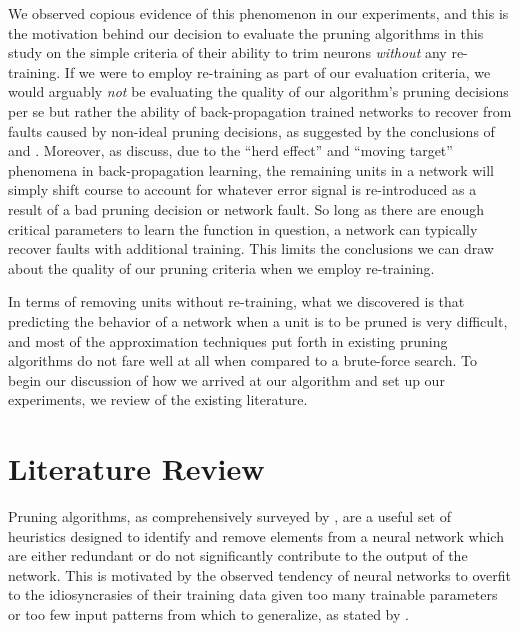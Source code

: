We observed copious evidence of this phenomenon in our experiments, and this is the motivation behind our decision to evaluate the pruning algorithms in this study on the simple criteria of their ability to trim neurons \textit{without} any re-training. If we were to employ re-training as part of our evaluation criteria, we would arguably \textit{not} be evaluating the quality of our algorithm's pruning decisions per se but rather the ability of back-propagation trained networks to recover from faults caused by non-ideal pruning decisions, as suggested by the conclusions of \cite{segee1991fault} and \cite{mozer1989skeletonization}. Moreover, as \cite{fahlman1989cascade} discuss, due to the ``herd effect'' and ``moving target'' phenomena in back-propagation learning, the remaining units in a network will simply shift course to account for whatever error signal is re-introduced as a result of a bad pruning decision or network fault. So long as there are enough critical parameters to learn the function in question, a network can typically recover faults with additional training. This limits the conclusions we can draw about the quality of our pruning criteria when we employ re-training. 

In terms of removing units without re-training, what we discovered is that predicting the behavior of a network when a unit is to be pruned is very difficult, and most of the approximation techniques put forth in existing pruning algorithms do not fare well at all when compared to a brute-force search. To begin our discussion of how we arrived at our algorithm and set up our experiments, we review of the existing literature.

\section{Literature Review}
Pruning algorithms, as comprehensively surveyed by \cite{reed1993pruning}, are a useful set of heuristics designed to identify and remove elements from a neural network which are either redundant or do not significantly contribute to the output of the network. This is motivated by the observed tendency of neural networks to overfit to the idiosyncrasies of their training data given too many trainable parameters or too few input patterns from which to generalize, as stated by \cite{chauvin1990generalization}. 

